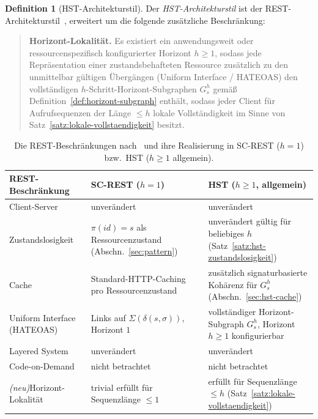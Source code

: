 ﻿\documentclass[a4paper,12pt]{article}
\theoremstyle{definition}
\newtheorem{definition}{Definition}
\begin{document}
\begin{definition}[HST-Architekturstil]
	\label{def:hst-architekturstil}
	Der \emph{HST-Architekturstil} ist der REST-Architekturstil~\cite{fielding2000},
	erweitert um die folgende zusätzliche Beschränkung:
	\begin{quote}
		\textbf{Horizont-Lokalität.} Es existiert ein anwendungsweit oder
		ressourcenspezifisch konfigurierter Horizont $h\ge1$, sodass jede
		Repräsentation einer zustandsbehafteten Ressource zusätzlich zu den unmittelbar
		gültigen Übergängen (Uniform Interface / HATEOAS) den vollständigen
		$h$-Schritt-Horizont-Subgraphen $G_s^h$ gemäß
		Definition~\ref{def:horizont-subgraph} enthält, sodass jeder Client für
		Aufrufsequenzen der Länge $\le h$ lokale Vollständigkeit im Sinne von
		Satz~\ref{satz:lokale-vollstaendigkeit} besitzt.
	\end{quote}
\end{definition}

\begin{table}[ht]
	\centering
	\renewcommand{\arraystretch}{1.35}
	\caption{Die REST-Beschränkungen nach~\cite{fielding2000} und ihre Realisierung in
	SC-REST ($h=1$) bzw.\ HST ($h\ge1$ allgemein).}
	\label{tab:rest-vergleich}
	\begin{tabular}{@{}p{3.3cm}p{5.55cm}p{5.55cm}@{}}
		\toprule
		REST-Beschränkung & SC-REST ($h=1$) & HST ($h\ge1$, allgemein) \\
		\midrule
		Client-Server & unverändert & unverändert \\
		Zustands\-losigkeit &
		$\pi(id)=s$ als Ressourcenzustand (Abschn.~\ref{sec:pattern}) &
		unverändert gültig für beliebiges $h$ (Satz~\ref{satz:hst-zustandslosigkeit}) \\
		Cache &
		Standard-HTTP-Caching pro Ressourcenzustand &
		zusätzlich signaturbasierte Kohärenz für $G_s^h$
		(Abschn.~\ref{sec:hst-cache}) \\
		Uniform Interface (\mbox{HATEOAS}) &
		Links auf $\Sigma(\delta(s,\sigma))$, Horizont $1$ &
		vollständiger Horizont-Subgraph $G_s^h$, Horizont $h\ge1$ konfigurierbar \\
		Layered System & unverändert & unverändert \\
		Code-on-Demand & nicht betrachtet & nicht betrachtet \\
		\emph{(neu)}\newline Horizont-Lokalität &
		trivial erfüllt für Sequenzlänge $\le1$ &
		erfüllt für Sequenzlänge $\le h$ (Satz~\ref{satz:lokale-vollstaendigkeit}) \\
		\bottomrule
	\end{tabular}
\end{table}
\end{document}
